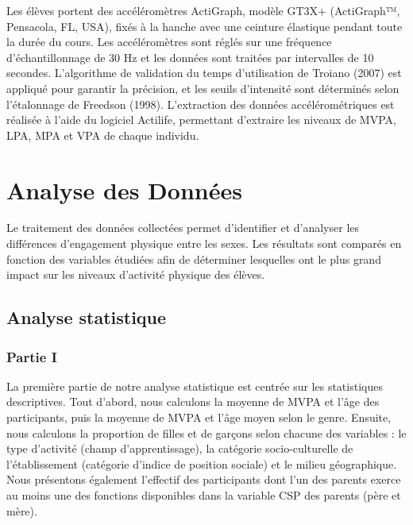 \documentclass[12pt,a4paper]{article}
\begin{document}
	Les élèves portent des accéléromètres ActiGraph, modèle GT3X+ (ActiGraph™, Pensacola, FL, USA), fixés à la hanche avec une ceinture élastique pendant toute la durée du cours. Les accéléromètres sont réglés sur une fréquence d'échantillonnage de 30 Hz et les données sont traitées par intervalles de 10 secondes. L'algorithme de validation du temps d'utilisation de Troiano (2007) est appliqué pour garantir la précision, et les seuils d'intensité sont déterminés selon l'étalonnage de Freedson (1998). L'extraction des données accélérométriques est réalisée à l'aide du logiciel Actilife, permettant d'extraire les niveaux de MVPA, LPA, MPA et VPA de chaque individu.
	
	\section{Analyse des Données}
	Le traitement des données collectées permet d’identifier et d’analyser les différences d’engagement physique entre les sexes. Les résultats sont comparés en fonction des variables étudiées afin de déterminer lesquelles ont le plus grand impact sur les niveaux d’activité physique des élèves.
	
	\subsection{Analyse statistique}
	\subsubsection{Partie I}
	La première partie de notre analyse statistique est centrée sur les statistiques descriptives. Tout d'abord, nous calculons la moyenne de MVPA et l'âge des participants, puis la moyenne de MVPA et l'âge moyen selon le genre. Ensuite, nous calculons la proportion de filles et de garçons selon chacune des variables : le type d'activité (champ d'apprentissage), la catégorie socio-culturelle de l'établissement (catégorie d'indice de position sociale) et le milieu géographique. Nous présentons également l'effectif des participants dont l'un des parents exerce au moins une des fonctions disponibles dans la variable CSP des parents (père et mère).
	
\end{document}

